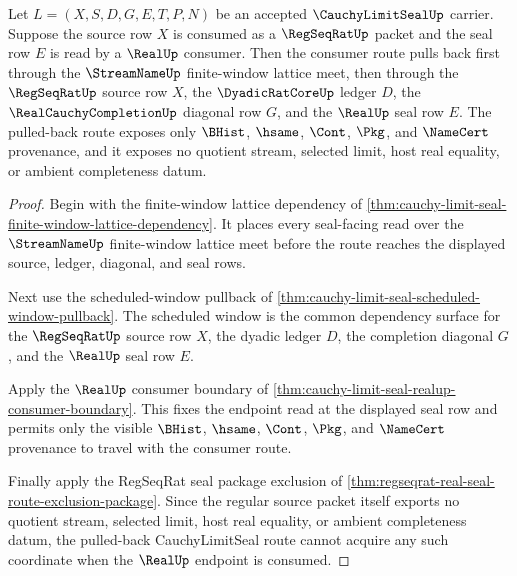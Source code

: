 \begin{theorem}
\label{thm:cauchy-limit-seal-regseqrat-real-finite-window-pullback}
Let $L=(X,S,D,G,E,T,P,N)$ be an accepted $\CauchyLimitSealUp$ carrier. Suppose the source row $X$ is consumed as a $\RegSeqRatUp$ packet and the seal row $E$ is read by a $\RealUp$ consumer. Then the consumer route pulls back first through the $\StreamNameUp$ finite-window lattice meet, then through the $\RegSeqRatUp$ source row $X$, the $\DyadicRatCoreUp$ ledger $D$, the $\RealCauchyCompletionUp$ diagonal row $G$, and the $\RealUp$ seal row $E$. The pulled-back route exposes only $\BHist$, $\hsame$, $\Cont$, $\Pkg$, and $\NameCert$ provenance, and it exposes no quotient stream, selected limit, host real equality, or ambient completeness datum.
\end{theorem}
\begin{proof}
Begin with the finite-window lattice dependency of \autoref{thm:cauchy-limit-seal-finite-window-lattice-dependency}. It places every seal-facing read over the $\StreamNameUp$ finite-window lattice meet before the route reaches the displayed source, ledger, diagonal, and seal rows.

Next use the scheduled-window pullback of \autoref{thm:cauchy-limit-seal-scheduled-window-pullback}. The scheduled window is the common dependency surface for the $\RegSeqRatUp$ source row $X$, the dyadic ledger $D$, the completion diagonal $G$, and the $\RealUp$ seal row $E$.

Apply the $\RealUp$ consumer boundary of \autoref{thm:cauchy-limit-seal-realup-consumer-boundary}. This fixes the endpoint read at the displayed seal row and permits only the visible $\BHist$, $\hsame$, $\Cont$, $\Pkg$, and $\NameCert$ provenance to travel with the consumer route.

Finally apply the RegSeqRat seal package exclusion of \autoref{thm:regseqrat-real-seal-route-exclusion-package}. Since the regular source packet itself exports no quotient stream, selected limit, host real equality, or ambient completeness datum, the pulled-back CauchyLimitSeal route cannot acquire any such coordinate when the $\RealUp$ endpoint is consumed.
\end{proof}

